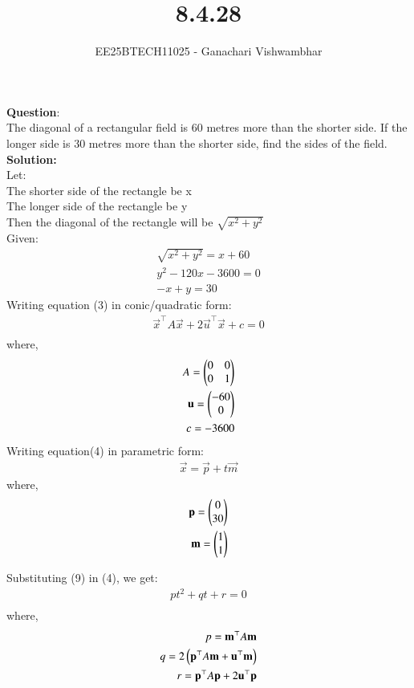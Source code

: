 \documentclass[journal]{IEEEtran}
\begin{document}
\title{8.4.28}
\author{EE25BTECH11025 - Ganachari Vishwambhar}
\maketitle

\textbf{Question}:\\
The diagonal of a rectangular field is 60 metres more than the shorter side. If the longer side is 30 metres more than the shorter side, find the sides of the field.\\
\textbf{Solution: }\\
Let:\\
The shorter side of the rectangle be x\\
The longer side of the rectangle be y\\
Then the diagonal of the rectangle will be $\sqrt{x^2+y^2}$\\
Given:
\begin{align}
    \sqrt{x^2+y^2}=x+60\\
    y^2-120x-3600=0\\
    -x+y=30
\end{align}
Writing equation (3) in conic/quadratic form:
\begin{align}
    \vec{x}^\top A\vec{x}+2\vec{u}^\top\vec{x}+c=0\\
\end{align}
where,
\begin{align}
    A=\begin{pmatrix}0&0\\0&1\end{pmatrix}\\
    \mathbf{u} = \begin{pmatrix}-60\\0\end{pmatrix}\\
    c = -3600 
\end{align}
Writing equation(4) in parametric form:
\begin{align}
    \vec{x} = \vec{p} + t\vec{m}
\end{align}
where,
\begin{align}
    \mathbf{p} = \begin{pmatrix}0\\30\end{pmatrix}\\
    \mathbf{m} = \begin{pmatrix}1\\1\end{pmatrix}
\end{align}

Substituting (9) in (4), we get:
\begin{align}
    pt^2+qt+r=0\\
\end{align}
where,
\begin{align}
    p=\mathbf{m}^\top A\mathbf{m}\\
    q=2\left(\mathbf{p}^\top A\mathbf{m}+\mathbf{u}^\top\mathbf{m}\right)\\
    r=\mathbf{p}^\top A\mathbf{p}+2\mathbf{u}^\top\mathbf{p}
\end{align}
\end{document}
